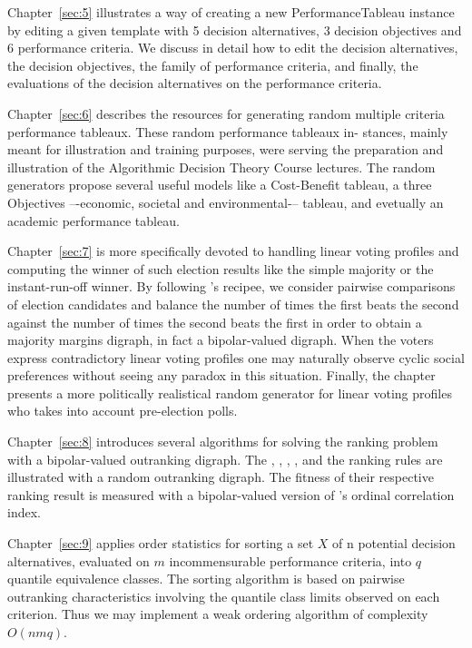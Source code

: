 Chapter~\vref{sec:5} illustrates a way of creating a new PerformanceTableau instance by editing a given template with 5 decision alternatives, 3 decision objectives and 6 performance criteria. We discuss in detail how to edit the decision alternatives, the decision objectives, the family of performance criteria, and finally, the evaluations of the decision alternatives on the performance criteria.

Chapter~\vref{sec:6} describes the \Digraph resources for generating random multiple criteria performance tableaux. These random performance tableaux in- stances, mainly meant for illustration and training purposes, were serving the preparation and illustration of the Algorithmic Decision Theory Course lectures. The random generators propose several useful models like a Cost-Benefit tableau, a three Objectives –-economic, societal and environmental-– tableau, and evetually an academic performance tableau.

Chapter~\vref{sec:7} is more specifically devoted to handling linear voting profiles and computing the winner of such election results like the simple majority or the instant-run-off winner. By following \Condorcet 's recipee, we consider pairwise comparisons of election candidates and balance the number of times the first beats the second against the number of times the second beats the first in order to obtain a majority margins digraph, in fact a bipolar-valued digraph. When the voters express contradictory linear voting profiles one may naturally observe cyclic social preferences without seeing any paradox in this situation. Finally, the chapter presents a more politically realistical random generator for linear voting profiles who takes into account pre-election polls.

Chapter~\vref{sec:8} introduces several algorithms for solving the ranking problem with a bipolar-valued outranking digraph. The \Copeland, \NetFlows, \Kemeny, \Slater, \Kohler and the \RankedPairs ranking rules are illustrated with a random outranking digraph. The fitness of their respective ranking result is measured with a bipolar-valued version of \Kendall 's ordinal correlation index.

Chapter~\vref{sec:9} applies order statistics for sorting a set $X$ of n potential decision alternatives, evaluated on $m$ incommensurable performance criteria, into $q$ quantile equivalence classes. The sorting algorithm is based on pairwise outranking characteristics involving the quantile class limits observed on each criterion. Thus we may implement a weak ordering algorithm of complexity $O(nmq)$.

